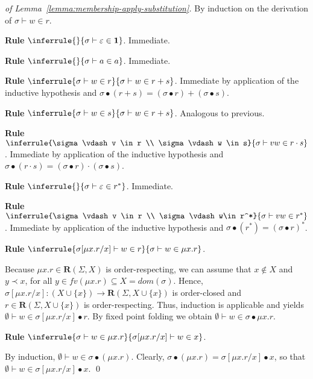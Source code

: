 \documentclass[runningheads, envcountsame, a4paper]{llncs}
\newcommand{\DOM}{{\textit{dom}}}
\newcommand\FV{{\textit{fv}}}
\newcommand\Rempty{\mathbf1}
\newcommand\Reg{\mathbf{R}}
\newcommand\ApplySubst[2]{#1 \bullet #2} %
\begin{document}
\clearpage{}
\begin{proof}[of Lemma~\ref{lemma:membership-apply-substitution}]
  By induction on the derivation of  $\sigma \vdash w \in r$.

  \textbf{Rule }$\inferrule{}{\sigma \vdash \varepsilon \in
    \Rempty}$. Immediate.

  \textbf{Rule }$\inferrule{}{\sigma \vdash a \in a}$. Immediate.

  \textbf{Rule }$\inferrule{\sigma \vdash w \in r}{\sigma \vdash w \in
    r+s}$. Immediate by application of the inductive hypothesis and
  $\ApplySubst\sigma{(r+s)} = (\ApplySubst\sigma r) + (\ApplySubst\sigma
  s)$.

  \textbf{Rule }$\inferrule{\sigma \vdash w \in s}{\sigma \vdash w \in
    r+s}$. Analogous to previous.

  \textbf{Rule }$\inferrule{\sigma \vdash v \in r \\ \sigma \vdash w \in s}{\sigma
    \vdash vw \in r\cdot s}$. Immediate by application of the inductive hypothesis and
  $\ApplySubst\sigma{(r\cdot s)} = (\ApplySubst\sigma r) \cdot (\ApplySubst\sigma
  s)$.

  \textbf{Rule }$\inferrule{}{\sigma \vdash \varepsilon \in
    r^*}$. Immediate.

  \textbf{Rule }$\inferrule{\sigma \vdash v \in r \\ \sigma\vdash w\in r^*}{\sigma
    \vdash vw \in r^*}$. Immediate by application of the inductive hypothesis and
  $\ApplySubst\sigma{(r^*)} = (\ApplySubst\sigma r)^*$.

  \textbf{Rule }$\inferrule{\sigma[\mu x. r/x] \vdash w \in r}{\sigma \vdash w \in
    \mu x.r}$.

  Because $\mu x.r \in \Reg (\Sigma, X)$ is order-respecting, we can assume
  that $x\notin X$ and  $y \prec x$, for all $y\in \FV (\mu x.r) \subseteq X = \DOM
  (\sigma)$.
  Hence, $\sigma[\mu x.r/x] : (X\cup\{x\}) \to \Reg (\Sigma,
  X\cup\{x\})$ is order-closed and $r \in \Reg (\Sigma,
  X\cup\{x\})$ is order-respecting. Thus, induction is applicable and  yields $\emptyset
  \vdash w \in \ApplySubst{\sigma[\mu x.r/x]}{r}$. By fixed point
  folding we obtain  $\emptyset
  \vdash w \in \ApplySubst{\sigma}{\mu x.r}$.

  \textbf{Rule }$\inferrule{\sigma \vdash w\in \mu x.r }{
      \sigma[\mu x. r/x]
      \vdash w \in x}$.

  By induction, $\emptyset \vdash w \in \ApplySubst\sigma {(\mu
    x.r)}$. Clearly, $\ApplySubst\sigma {(\mu x.r)} =
  \ApplySubst{\sigma[\mu x. r/x]}{x}$, so that $\emptyset \vdash w \in
  \ApplySubst{\sigma[\mu x. r/x]} x$.
  \qed
\end{proof}
\end{document}
